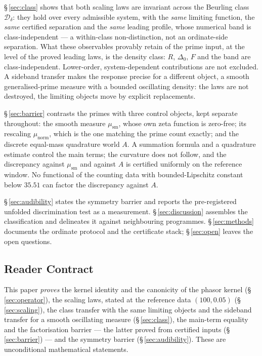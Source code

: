 \documentclass[11pt]{article}
\newcommand{\Dclass}{\mathcal{D}_\delta}        %
\begin{document}
\S\,\ref{sec:class} shows that both scaling laws are invariant across the
Beurling class $\Dclass$: they hold over every admissible system, with the
\emph{same} limiting function, the \emph{same} certified separation and the
\emph{same} leading profile, whose numerical band is class-independent --- a
within-class non-distinction, not an ordinate-side separation. What these
observables provably retain of the prime input, at the level of the proved
leading laws, is the density class: $R$, $\Delta_0$, $F$ and the band are
class-independent. Lower-order, system-dependent contributions are not
excluded. A sideband transfer
makes the response precise for a different object, a smooth generalised-prime
measure with a bounded oscillating density: the laws are not destroyed, the
limiting objects move by explicit replacements.

\S\,\ref{sec:barrier} contrasts the primes with three control objects, kept
separate throughout: the smooth measure $\mu_{\mathrm{sm}}$, whose own zeta
function is zero-free; its rescaling $\mu_{\mathrm{norm}}$, which is the one
matching the prime count exactly; and the discrete equal-mass quadrature world
$A$. A summation formula and a quadrature estimate control the main terms; the
curvature does not follow, and the discrepancy against $\mu_{\mathrm{sm}}$ and
against $A$ is certified uniformly on the reference window. No functional of
the counting data with bounded-Lipschitz constant below $35.51$ can factor the
discrepancy against $A$.

\S\,\ref{sec:audibility} states the symmetry barrier and reports the
pre-registered unfolded discrimination test as a measurement.
\S\,\ref{sec:discussion} assembles the classification and delineates it
against neighbouring programmes. \S\,\ref{sec:methods} documents the ordinate
protocol and the certificate stack; \S\,\ref{sec:open} leaves the open
questions.

\subsection{Reader Contract}

This paper \emph{proves} the kernel identity and the canonicity of the phasor
kernel (\S\,\ref{sec:operator}), the scaling laws, stated at the
reference data $(100,0.05)$ (\S\,\ref{sec:scaling}), the class transfer with the same limiting objects and the
sideband transfer for a smooth oscillating measure (\S\,\ref{sec:class}), the main-term equality and the
factorisation barrier --- the latter proved from certified inputs
(\S\,\ref{sec:barrier}) --- and the symmetry barrier
(\S\,\ref{sec:audibility}). These are unconditional mathematical statements.
\end{document}
